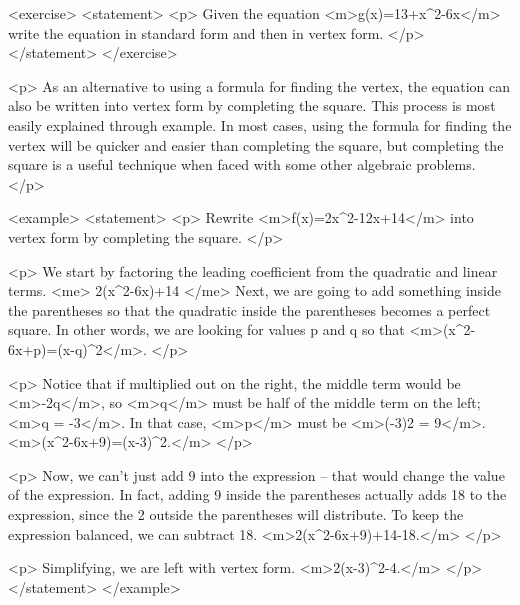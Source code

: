         <exercise>
            <statement>
                <p>
                    Given the equation <m>g(x)=13+x^{2}-6x</m> write the equation in standard form and then in vertex form.
                </p>
            </statement>
        </exercise>

        <p>
            As an alternative to using a formula for finding the vertex, the equation can also be written into vertex form by completing the square.
            This process is most easily explained through example.
            In most cases, using the formula for finding the vertex will be quicker and easier than completing the square, but completing the square is a useful technique when faced with some other algebraic problems.
        </p>

        <example>
            <statement>
                <p>
                    Rewrite <m>f(x)=2x^{2}-12x+14</m> into vertex form by completing the square.
                </p>

                <p>
                    We start by factoring the leading coefficient from the quadratic and linear terms.
                    <me>
                        2(x^{2}-6x)+14
                    </me>
                    Next, we are going to add something inside the parentheses so that the quadratic inside the parentheses becomes a perfect square.
                    In other words, we are looking for values p and q so that <m>(x^{2}-6x+p)=(x-q)^{2}</m>.
                </p>

                <p>
                    Notice that if multiplied out on the right, the middle term would be <m>-2q</m>, so <m>q</m> must be half of the middle term on the left; <m>q = -3</m>.
                    In that case, <m>p</m> must be <m>(-3)2 = 9</m>.
                    <m>(x^{2}-6x+9)=(x-3)^{2}.</m>
                </p>

                <p>
                    Now, we can’t just add 9 into the expression – that would change the value of the expression.
                    In fact, adding 9 inside the parentheses actually adds 18 to the expression, since the 2 outside the parentheses will distribute.
                    To keep the expression balanced, we can subtract 18.
                    <m>2(x^{2}-6x+9)+14-18.</m>
                </p>

                <p>
                    Simplifying, we are left with vertex form.
                    <m>2(x-3)^{2}-4.</m>
                </p>
            </statement>
        </example>

